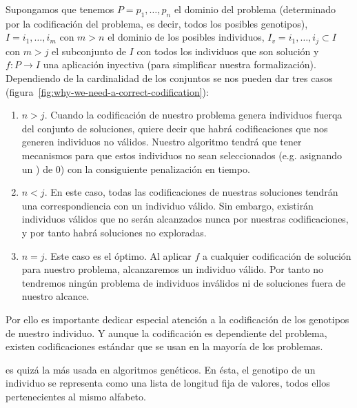 Supongamos que tenemos $P = {p_1, \ldots, p_n}$ el dominio del problema (determinado por la codificación del problema, es decir, todos los posibles genotipos), $I = {i_1, \ldots, i_m}$ con $m > n$ el dominio de los posibles individuos, $I_v = {i_1, \ldots, i_j} \subset I$ con $m > j$ el subconjunto de $I$ con todos los individuos que son solución y $f:P \rightarrow I$ una aplicación inyectiva (para simplificar nuestra formalización). Dependiendo de la cardinalidad de los conjuntos se nos pueden dar tres casos (figura~\ref{fig:why-we-need-a-correct-codification}):

\begin{enumerate}
	\item $n > j$. Cuando la codificación de nuestro problema genera individuos fuerqa del conjunto de soluciones, quiere decir que habrá codificaciones que nos generen individuos no válidos. Nuestro algoritmo tendrá que tener mecanismos para que estos individuos no sean seleccionados (e.g. asignando un \textit{}) de $0$) con la consiguiente penalización en tiempo.
	\item $n < j$. En este caso, todas las codificaciones de nuestras soluciones tendrán una correspondiencia con un individuo válido. Sin embargo, existirán individuos válidos que no serán alcanzados nunca por nuestras codificaciones, y por tanto habrá soluciones no exploradas.
	\item $n = j$. Este caso es el óptimo. Al aplicar $f$ a cualquier codificación de solución para nuestro problema, alcanzaremos un individuo válido. Por tanto no tendremos ningún problema de individuos inválidos ni de soluciones fuera de nuestro alcance.
\end{enumerate}

Por ello es importante dedicar especial atención a la codificación de los genotipos de nuestro individuo. Y aunque la codificación es dependiente del problema, existen codificaciones estándar que se usan en la mayoría de los problemas.

 es quizá la más usada en algoritmos genéticos. En ésta, el genotipo de un individuo se representa como una lista de longitud fija de valores, todos ellos pertenecientes al mismo alfabeto.

